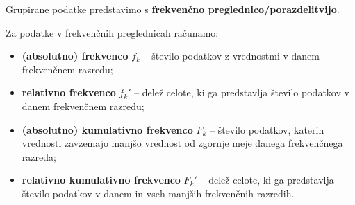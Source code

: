         \begin{frame}
            \begin{alertblock}{}
                Grupirane podatke predstavimo s \textbf{frekvenčno preglednico/porazdelitvijo}.
            \end{alertblock}

            \begin{alertblock}{}
                Za podatke v frekvenčnih preglednicah računamo:
                \begin{itemize}
                    \item \textbf{(absolutno) frekvenco} $f_k$ -- število podatkov z vrednostmi v danem frekvenčnem razredu;
                    \item \textbf{relativno frekvenco} $f_k'$ -- delež celote, ki ga predstavlja število podatkov v danem frekvenčnem razredu;
                    \item \textbf{(absolutno) kumulativno frekvenco} $F_k$ -- število podatkov, katerih vrednosti zavzemajo manjšo vrednost od zgornje meje danega frekvenčnega razreda;
                    \item \textbf{relativno kumulativno frekvenco} $F_k'$ -- delež celote, ki ga predstavlja število podatkov v danem in vseh manjših frekvenčnih razredih.
                \end{itemize}
            \end{alertblock}
        \end{frame}




